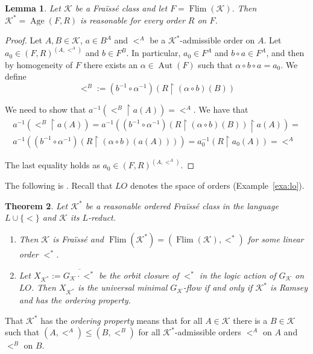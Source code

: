 \documentclass[12pt]{amsart}
\theoremstyle{plain}
\newtheorem{theorem}{Theorem}[section]
\newtheorem{lemma}[theorem]{Lemma}
\theoremstyle{definition}
\begin{document}
\begin{lemma}\label{lem:reason}
Let ${\mathcal K}$ be a Fra\"iss\'e class and let $F=\operatorname{Flim}({\mathcal K})$. Then ${\mathcal K}^*=\operatorname{Age}(F, R)$ is reasonable for every order $R$ on $F$.
\end{lemma}
\begin{proof}
Let $A,B\in{\mathcal K}$, $a\in B^A$ and $<^A$ be a ${\mathcal K}^*$-admissible order on $A$. Let $a_0\in (F, R)^{(A, <^A)}$ and $b\in F^B$. In particular, $a_0\in F^A$ and $b\circ a \in F^A$, and then by homogeneity of $F$ there exists an $\alpha\in\operatorname{Aut}(F)$ such that $\alpha\circ b\circ a = a_0$. We define 
$$<^B := (b^{-1}\circ \alpha^{-1})(R\upharpoonright (\alpha\circ b)(B))$$

We need to show that $a^{-1}(<^B\upharpoonright a(A)) = <^A$. We have that 
\begin{multline*}
a^{-1}(<^B\upharpoonright a(A)) = a^{-1}((b^{-1}\circ \alpha^{-1})(R\upharpoonright (\alpha\circ b)(B))\upharpoonright a(A)) =\\ a^{-1}((b^{-1}\circ \alpha^{-1})(R\upharpoonright (\alpha\circ b)(a(A)))) = a_0^{-1}(R\upharpoonright a_0(A))= <^A
\end{multline*}

The last equality holds as $a_0\in (F, R)^{(A, <^A)}$.
\end{proof}

The following is \cite[P5.2,~T10.8]{kpt}. Recall that $\textit{LO}$ denotes the space of orders (Example~\ref{exa:lo}).

\begin{theorem}\label{thm:minflow} Let ${\mathcal K}^*$ be a reasonable ordered Fra\"iss\'e class in the language $L\cup\{<\}$ 
and ${\mathcal K}$ its $L$-reduct. 
\begin{enumerate}
\item Then ${\mathcal K}$ is  Fra\"iss\'e and $\operatorname{Flim}({\mathcal K}^*)=(\operatorname{Flim}({\mathcal K}),<^*)$ for some linear order $<^*$. 
\item Let $X_{{\mathcal K}^*}:=\overline{G_{\mathcal K}\cdot <^*}$ be the orbit closure of $<^*$ in the logic action of $G_{\mathcal K}$ on  
$\textit{LO}$. Then $X_{{\mathcal K}^*}$ is the universal minimal $G_{\mathcal K}$-flow if and only if ${\mathcal K}^*$ is Ramsey and has the ordering property.
\end{enumerate}
\end{theorem}

That ${\mathcal K}^*$  has the {\em ordering property} means that for all $A\in{\mathcal K}$ there is a $B\in{\mathcal K}$ such that
$(A,<^A)\le(B,<^B)$ for all ${\mathcal K}^*$-admissible orders $<^A$ on $A$ and $<^B$ on $B$.
\end{document}
